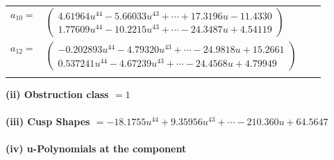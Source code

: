 \documentclass[1p]{elsarticle_modified}
\theoremstyle{definition}
\begin{document}
\begin{tabular}{m{7pt} m{180pt} m{7pt} m{180pt} }
\flushright $a_{10}=$&$\begin{pmatrix}4.61964 u^{44}-5.66033 u^{43}+\cdots+17.3196 u-11.4330\\1.77609 u^{44}-10.2215 u^{43}+\cdots-24.3487 u+4.54119\end{pmatrix}$ \\
\flushright $a_{12}=$&$\begin{pmatrix}-0.202893 u^{44}-4.79320 u^{43}+\cdots-24.9818 u+15.2661\\0.537241 u^{44}-4.67239 u^{43}+\cdots-24.4568 u+4.79949\end{pmatrix}$\\&\end{tabular}
\flushleft \textbf{(ii) Obstruction class $= 1$}\\~\\
\flushleft \textbf{(iii) Cusp Shapes $= -18.1755 u^{44}+9.35956 u^{43}+\cdots-210.360 u+64.5647$}\\~\\
\newpage\renewcommand{\arraystretch}{1}
\flushleft \textbf{(iv) u-Polynomials at the component}\newline \\
\end{document}

